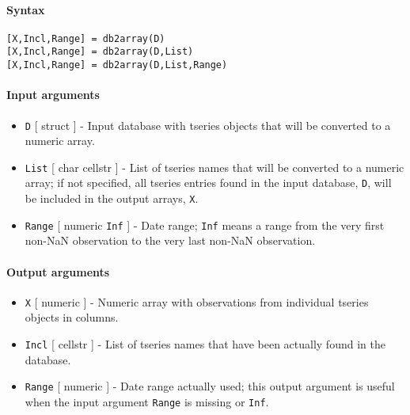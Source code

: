 


	\paragraph{Syntax}

\begin{verbatim}
[X,Incl,Range] = db2array(D)
[X,Incl,Range] = db2array(D,List)
[X,Incl,Range] = db2array(D,List,Range)
\end{verbatim}

\paragraph{Input arguments}

\begin{itemize}
\item
  \texttt{D} {[} struct {]} - Input database with tseries objects that
  will be converted to a numeric array.
\item
  \texttt{List} {[} char \textbar{} cellstr {]} - List of tseries names
  that will be converted to a numeric array; if not specified, all
  tseries entries found in the input database, \texttt{D}, will be
  included in the output arrays, \texttt{X}.
\item
  \texttt{Range} {[} numeric \textbar{} \texttt{Inf} {]} - Date range;
  \texttt{Inf} means a range from the very first non-NaN observation to
  the very last non-NaN observation.
\end{itemize}

\paragraph{Output arguments}

\begin{itemize}
\item
  \texttt{X} {[} numeric {]} - Numeric array with observations from
  individual tseries objects in columns.
\item
  \texttt{Incl} {[} cellstr {]} - List of tseries names that have been
  actually found in the database.
\item
  \texttt{Range} {[} numeric {]} - Date range actually used; this output
  argument is useful when the input argument \texttt{Range} is missing
  or \texttt{Inf}.
\end{itemize}

